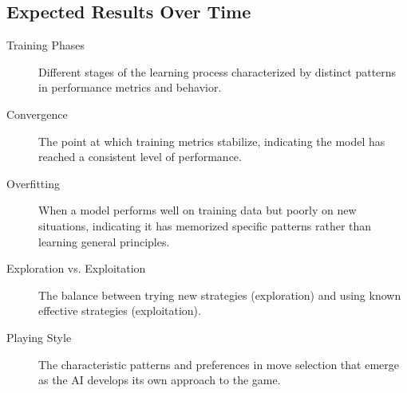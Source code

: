 \documentclass[11pt]{article}
\newenvironment{termbox}[1]
  {\begin{tcolorbox}[colback=blue!5!white,colframe=blue!75!black,title=#1,fonttitle=\bfseries]}
  {\end{tcolorbox}}
\begin{document}
\subsection{Expected Results Over Time}

\begin{termbox}{Key Technical Terms in Training Progression}
\begin{description}
    \item[Training Phases] Different stages of the learning process characterized by distinct patterns in performance metrics and behavior.
    
    \item[Convergence] The point at which training metrics stabilize, indicating the model has reached a consistent level of performance.
    
    \item[Overfitting] When a model performs well on training data but poorly on new situations, indicating it has memorized specific patterns rather than learning general principles.
    
    \item[Exploration vs. Exploitation] The balance between trying new strategies (exploration) and using known effective strategies (exploitation).
    
    \item[Playing Style] The characteristic patterns and preferences in move selection that emerge as the AI develops its own approach to the game.
\end{description}
\end{termbox}
\end{document}
